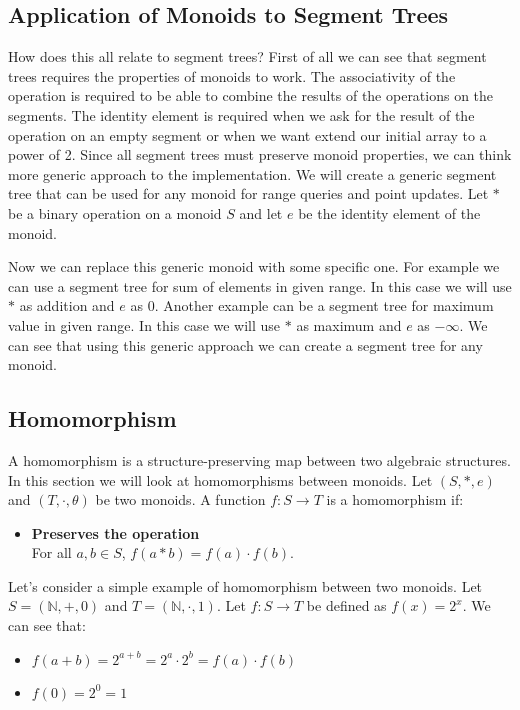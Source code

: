 \documentclass[11pt]{article}
\begin{document}
\subsection{Application of Monoids to Segment Trees}
How does this all relate to segment trees?
First of all we can see that segment trees requires the properties of monoids to work.
The associativity of the operation is required to be able to combine the results of the operations on the segments.
The identity element is required when we ask for the result of the operation on an empty segment or 
when we want extend our initial array to a power of 2. 
Since all segment trees must preserve monoid properties, we can think more generic 
approach to the implementation. We will create a generic segment tree that can be used for any monoid for 
range queries and point updates. Let \(\ast\) be a binary operation on a monoid \(S\) and let \(e\) be the identity element of the monoid.


\FloatBarrier
Now we can replace this generic monoid with some specific one.
For example we can use a segment tree for sum of elements in given range.
In this case we will use \(\ast\) as addition and \(e\) as 0. 
Another example can be a segment tree for maximum value in given range.
In this case we will use \(\ast\) as maximum and \(e\) as \(-\infty\).
We can see that using this generic approach we can create a segment tree for any monoid.

\subsection{Homomorphism}
A homomorphism is a structure-preserving map between two algebraic structures.
In this section we will look at homomorphisms between monoids.
Let \( (S, \ast, e) \) and \( (T, \cdot, \theta) \) be two monoids.
A function \( f: S \to T \) is a homomorphism if:
\begin{itemize}
    \item \textbf{Preserves the operation} \\
    For all \( a, b \in S \), \( f(a \ast b) = f(a) \cdot f(b) \).
\end{itemize}
Let's consider a simple example of homomorphism between two monoids.
Let \( S = (\mathbb{N}, +, 0) \) and \( T = (\mathbb{N}, \cdot, 1) \).
Let \( f: S \to T \) be defined as \( f(x) = 2^x \).
We can see that:
\begin{itemize}
    \item \( f(a + b) = 2^{a + b} = 2^a \cdot 2^b = f(a) \cdot f(b) \)
    \item \( f(0) = 2^0 = 1 \)
\end{itemize}
\end{document}
